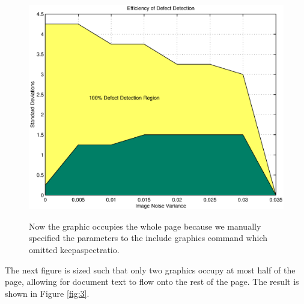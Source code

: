 \documentclass{article}
\begin{document}
\begin{figure}
 {\includegraphics[width=\figwidth,
totalheight=\figheight]{epsfig}}
    \caption{Now the graphic occupies the whole page because
     we manually specified the parameters to the
    include graphics command which omitted keepaspectratio.}\label{fig:2b}
\end{figure}


The next figure is sized such that only two graphics occupy at
most half of the page, allowing for document text to flow onto the
rest of the page. The result is shown in Figure \ref{fig:3}.
\end{document}
